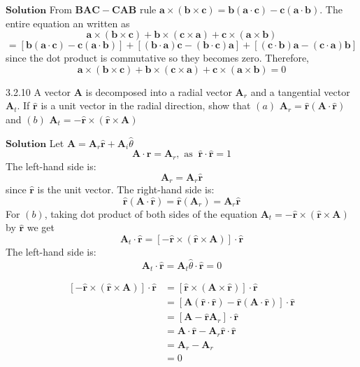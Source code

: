 $\boxed{\textbf{Solution}}$ From $\mathbf{BA}\mathbf{C}-\mathbf{C}\mathbf{AB}$ rule $\mathbf{a}\times(\mathbf{b} \times \mathbf{c})=\mathbf{b}(\mathbf{a}\cdot \mathbf{c})-\mathbf{c}(\mathbf{a} \cdot \mathbf{b}).$ The entire equation an written as
$$
\mathbf{a}\times(\mathbf{b} \times \mathbf{c})+\mathbf{b} \times(\mathbf{c} \times \mathbf{a})+\mathbf{c} \times(\mathbf{a} \times \mathbf{b})$$
$$=[\mathbf{b}(\mathbf{a} \cdot \mathbf{c})-\mathbf{c}(\mathbf{a} \cdot \mathbf{b})]+[(\mathbf{b} \cdot \mathbf{a}) \mathbf{c}-(\mathbf{b} \cdot \mathbf{c}) \mathbf{a}]+[(\mathbf{c} \cdot \mathbf{b}) \mathbf{a}-(\mathbf{c} \cdot \mathbf{a}) \mathbf{b}]
$$
since the dot product is commutative so they becomes zero.
Therefore, $$ \mathbf{a}\times(\mathbf{b} \times \mathbf{c})+\mathbf{b} \times(\mathbf{c} \times \mathbf{a})+\mathbf{c} \times(\mathbf{a} \times \mathbf{b})=0$$


\newpage


\begin{mybox}{3.2.10}
A vector $\mathbf{A}$ is decomposed into a radial vector $\mathbf{A}_{r}$ and a tangential vector $\mathbf{A}_{t} .$ If $\hat{\mathbf{r}}$ is a unit vector in the radial direction, show that
$(a)$ $\mathbf{A}_{r}=\hat{\mathbf{r}}(\mathbf{A} \cdot \hat{\mathbf{r}})$ and
$(b)$ $\mathbf{A}_{t}=-\hat{\mathbf{r}} \times(\hat{\mathbf{r}} \times \mathbf{A})$
\end{mybox}


$\boxed{\textbf{Solution}}$ Let $\mathbf{A}=\mathbf{A}_{r} \hat{\mathbf{r}}+\mathbf{A}_{i} \hat{\theta}$
$$
\mathbf{A} \cdot \hat{\mathbf{r}}=\mathbf{A}_{r}, \text { as } \ \hat{\mathbf{r}} \cdot \hat{\mathbf{r}}=1
$$
The left-hand side is:
$$\mathbf{A}_{r}=\mathbf{A}_{r} \hat{\mathbf{r}}$$ since $\hat{\mathbf{r}}$ is the unit vector.
The right-hand side is:
$$
\hat{\mathbf{r}}(\mathbf{A} \cdot \hat{\mathbf{r}})=\hat{\mathbf{r}}\left(\mathbf{A}_{r}\right)=\mathbf{A}_{r} \hat{\mathbf{r}}
$$
For $(b)$, taking dot product of both sides of the equation $\mathbf{A}_{t}=-\hat{\mathbf{r}} \times(\hat{\mathbf{r}} \times \mathbf{A})$ by $\hat{\mathbf{r}}$ we get
$$
\mathbf{A}_{t} \cdot \hat{\mathbf{r}}=[-\hat{\mathbf{r}} \times(\hat{\mathbf{r}} \times \mathbf{A})] \cdot \hat{\mathbf{r}}
$$
The left-hand side is:
$$
\mathbf{A}_{t} \cdot \hat{\mathbf{r}}=\mathbf{A}_{t} \hat{\theta} \cdot \hat{\mathbf{r}}=0
$$

$$
\begin{aligned}
[-\hat{\mathbf{r}} \times(\hat{\mathbf{r}} \times \mathbf{A})] \cdot \hat{\mathbf{r}}&=[\hat{\mathbf{r}} \times(\mathbf{A} \times \hat{\mathbf{r}})] \cdot \hat{\mathbf{r}} \\
&=[\mathbf{A}(\hat{\mathbf{r}} \cdot \hat{\mathbf{r}})-\hat{\mathbf{r}}(\mathbf{A} \cdot \hat{\mathbf{r}})] \cdot \hat{\mathbf{r}} \\
&=\left[\mathbf{A}-\hat{\mathbf{r}} \mathbf{A}_{r}\right] \cdot \hat{\mathbf{r}} \\
&=\mathbf{A} \cdot \hat{\mathbf{r}}-\mathbf{A}_{r} \hat{\mathbf{r}} \cdot \hat{\mathbf{r}} \\
&=\mathbf{A}_{r}-\mathbf{A}_{r}\\
&=0
\end{aligned}
$$

